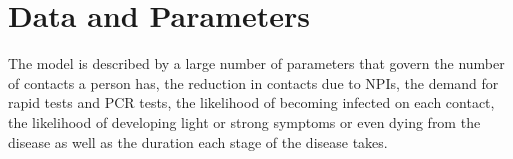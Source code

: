 \section{Data and Parameters}
\label{sec:data_and_parameters}

The model is described by a large number of parameters that govern the number of contacts
a person has, the reduction in contacts due to NPIs, the demand for rapid tests and PCR
tests, the likelihood of becoming infected on each contact, the likelihood of developing
light or strong symptoms or even dying from the disease as well as the duration each
stage of the disease takes.

















